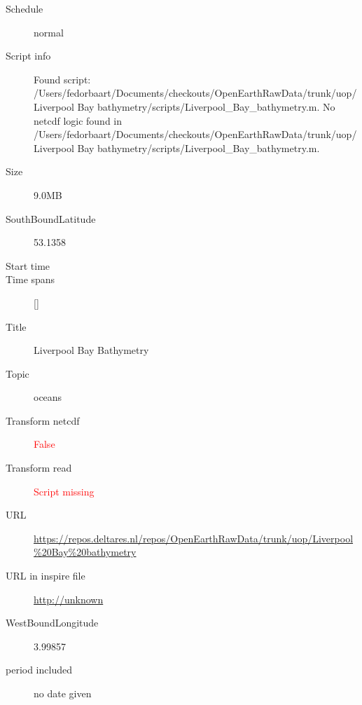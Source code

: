 \documentclass[9]{report}
\begin{document}
\begin{description}
\begin{verbatim}
\end{verbatim}
  \item[Schedule] normal
  \item[Script info] Found script: /Users/fedorbaart/Documents/checkouts/OpenEarthRawData/trunk/uop/Liverpool Bay bathymetry/scripts/Liverpool\_Bay\_bathymetry.m.
No netcdf logic found in /Users/fedorbaart/Documents/checkouts/OpenEarthRawData/trunk/uop/Liverpool Bay bathymetry/scripts/Liverpool\_Bay\_bathymetry.m.
  \item[Size] 9.0MB
  \item[SouthBoundLatitude] 53.1358
  \item[Start time] 
  \item[Time spans] []
  \item[Title]  Liverpool Bay Bathymetry 
  \item[Topic] oceans
  \item[Transform netcdf] \textcolor{red}{False}
  \item[Transform read] \textcolor{red}{Script missing}
  \item[URL] \href{https://repos.deltares.nl/repos/OpenEarthRawData/trunk/uop/Liverpool\%20Bay\%20bathymetry}{https://repos.deltares.nl/repos/OpenEarthRawData/trunk/uop/Liverpool\%20Bay\%20bathymetry}
  \item[URL in inspire file] \href{http://unknown}{http://unknown}
  \item[WestBoundLongitude] 3.99857
  \item[period included] no date given
\end{description}
\end{document}
